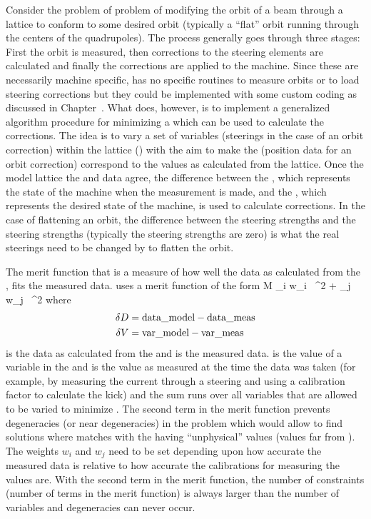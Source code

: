 Consider the problem of problem of modifying the orbit of a beam through a lattice to
conform to some desired orbit (typically a ``flat'' orbit running through the centers of
the quadrupoles). The process generally goes through three stages: First the orbit is
measured, then corrections to the steering elements are calculated and finally the
corrections are applied to the machine. Since these are necessarily machine specific, \tao
has no specific routines to measure orbits or to load steering corrections but they could
be implemented with some custom coding as discussed in Chapter~. What
\tao does, however, is to implement a generalized algorithm procedure for minimizing a
 which can be used to calculate the corrections.  The idea is to vary a
set of variables (steerings in the case of an orbit correction) within the 
lattice () with the aim to make the   (position
data for an orbit correction) correspond to the values as calculated from the 
lattice.  Once the model lattice the  and  data agree, the
difference between the , which represents the state of the machine when the
measurement is made, and the , which represents the desired state of the
machine, is used to calculate corrections. In the case of flattening an orbit, the
difference between the  steering strengths and the  steering
strengths (typically the  steering strengths are zero) is what the real
steerings need to be changed by to flatten the orbit.

The merit function  that is a measure of how well the data as calculated from the
, fits the measured data. \tao uses a merit function of the form
\Begineq
  {\cal M} \equiv 
    \sum_{i} w_i \, ^2 + 
    \sum_{j} w_j \, ^2
  \label{m1}
\Endeq
where
\begin{align}
  \delta D &= {\mbox{data}}\_{\mbox{model}} - {\mbox{data}}\_{\mbox{meas}} \nonumber \\
  \delta V &= {\mbox{var}}\_{\mbox{model}}  - {\mbox{var}}\_{\mbox{meas}}
  \label{dd1}
\end{align}
 is the data as calculated from the  and  is the
measured data.  is the value of a variable in the  and
 is the value as measured at the time the data was taken (for example, by
measuring the current through a steering and using a calibration factor to calculate the
kick) and the sum  runs over all variables that are allowed to be varied to minimize
. The second term in the merit function prevents degeneracies (or near
degeneracies) in the problem which would allow \tao to find solutions where
 matches  with the  having ``unphysical''
values (values far from ). The weights $w_i$ and $w_j$ need to be set
depending upon how accurate the measured data is relative to how accurate the calibrations
for measuring the  values are. With the second term in the merit function,
the number of constraints (number of terms in the merit function) is always larger than
the number of variables and degeneracies can never occur.

